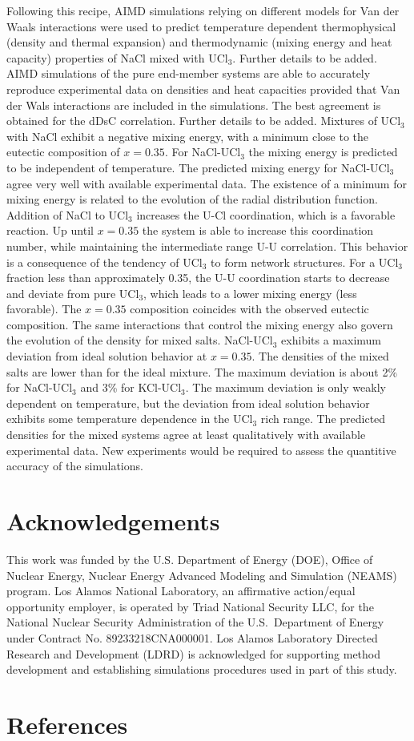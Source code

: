 \documentclass[preprint,3p,10pt,onecolumn,number,sort&compress]{elsarticle}
\begin{document}
Following this recipe, AIMD simulations relying on different models for Van der Waals interactions were used to predict temperature dependent thermophysical (density and thermal expansion) and thermodynamic (mixing energy and heat capacity) properties of NaCl mixed with UCl$_3$. {\color{red} Further details to be added.}
AIMD simulations of the pure end-member systems are able to accurately reproduce experimental data on densities and heat capacities provided that Van der Wals interactions are included in the simulations. The best agreement is obtained for the dDsC correlation. {\color{red} Further details to be added.} Mixtures of UCl$_3$ with NaCl exhibit a negative mixing energy, with a minimum close to the eutectic composition of $x=0.35$. For NaCl-UCl$_3$ the mixing energy is predicted to be independent of temperature. The predicted mixing energy for NaCl-UCl$_3$ agree very well with available experimental data. 
The existence of a minimum for mixing energy is related to the evolution of the radial distribution function. Addition of NaCl to UCl$_3$ increases the U-Cl coordination, which is a favorable reaction. Up until $x=0.35$ the system is able to increase this coordination number, while maintaining the intermediate range U-U correlation. This behavior is a consequence of the tendency of UCl$_3$ to form network structures. For a UCl$_3$ fraction less than approximately 0.35, the U-U coordination starts to decrease and deviate from pure UCl$_3$, which leads to a lower mixing energy (less favorable). The $x=0.35$ composition coincides with the observed eutectic composition. 
The same interactions that control the mixing energy also govern the evolution of the density for mixed salts. NaCl-UCl$_3$ exhibits a maximum deviation from ideal solution behavior at $x=0.35$. The densities of the mixed salts are lower than for the ideal mixture. The maximum deviation is about 2\% for NaCl-UCl$_3$ and 3\% for KCl-UCl$_3$. The maximum deviation is only weakly dependent on temperature, but the deviation from ideal solution behavior exhibits some temperature dependence in the UCl$_3$ rich range. The predicted densities for the mixed systems agree at least qualitatively with available experimental data. New experiments would be required to assess the quantitive accuracy of the simulations. 

\section*{Acknowledgements}
This work was funded by the U.S. Department of Energy (DOE), Office of Nuclear Energy, Nuclear Energy Advanced Modeling and Simulation (NEAMS) program. Los Alamos National Laboratory, an affirmative action/equal opportunity employer, is operated by Triad National Security LLC, for the National Nuclear Security Administration of the U.S.\ Department of Energy under Contract No. 89233218CNA000001. Los Alamos Laboratory Directed Research and Development (LDRD) is acknowledged for supporting method development and establishing simulations procedures used in part of this study.

\section*{References}

         

\end{document}

